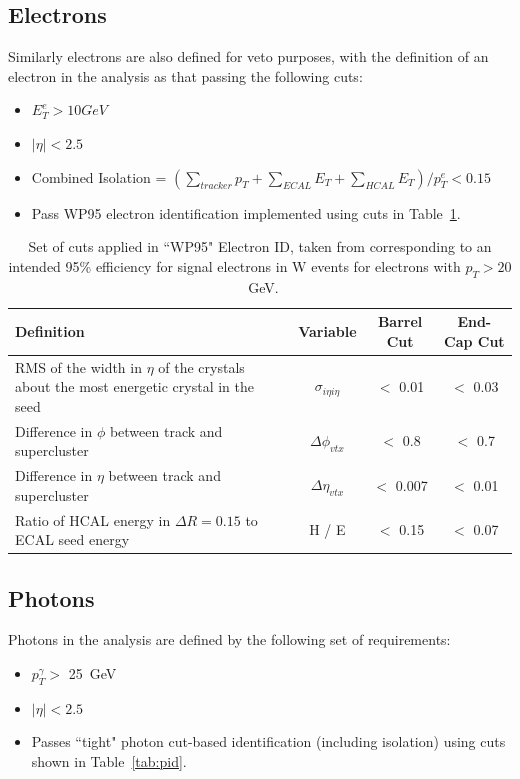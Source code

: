\subsection{Electrons}
Similarly electrons are also defined for veto purposes, with the definition of an electron in the analysis as that passing the following cuts:

\begin{itemize}
\item $E^{e}_{T} > 10 GeV$
\item $|\eta| < 2.5$
\item Combined Isolation = $(\sum_{tracker} p_{T} + \sum_{ECAL}E_{T} + \sum_{HCAL}E_{T})/p^{e}_{T} < 0.15$
\item Pass WP95 electron identification implemented using cuts in Table~\ref{tab:eid}.
\end{itemize}

\begin{table}[htbp]
\centering
\begin{tabular}{ m{6.9cm}  c  c  c}
\hline
\hline
 \centering Definition & Variable & Barrel Cut & End-Cap Cut \\
\hline
\hline
RMS of the width in $\eta$ of the crystals about the most energetic crystal in the seed& $\sigma_{i \eta i \eta}$ & $<$ 0.01 & $<$ 0.03\\
Difference in $\phi$ between track and supercluster&$\Delta \phi_{vtx}$& $<$ 0.8 & $<$ 0.7 \\
Difference in $\eta$ between track and supercluster& $\Delta \eta_{vtx}$& $<$ 0.007 & $<$ 0.01\\
Ratio of HCAL energy in $\Delta R = 0.15$ to ECAL seed energy & H / E & $<$ 0.15 & $<$ 0.07\\
\hline
\end{tabular}
\caption{\label{tab:eid} Set of cuts applied in ``WP95" Electron ID, taken from \cite{AN-10-116} corresponding to an intended 95\% efficiency for signal electrons in W events for electrons with $p_{T} > 20$~GeV.}
\end{table}
\subsection{Photons}

Photons in the analysis are defined by the following set of requirements:
\begin{itemize}
\item $p_{T}^{\gamma} > $ 25~GeV
\item $|\eta| < 2.5$
\item Passes ``tight" photon cut-based identification (including isolation) using cuts shown in Table~\ref{tab:pid}.
\end{itemize}


